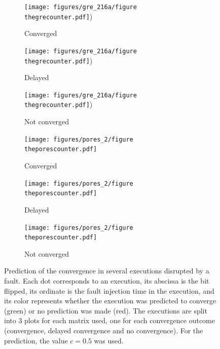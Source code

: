 \documentclass[twoside]{article}
\newcounter{fig}\setcounter{fig}{0}
\begin{document}
\begin{figure}[H]
    \begin{minipage}[b]{0.48\linewidth}
      \begin{subfigure}[t]{\linewidth}
        \centering
        \texttt{[image: figures/gre\_216a/figure\\thegrecounter.pdf]})
        \caption{Converged}\label{fig:gre_216a_conv_hist_location_0}		
      \end{subfigure}
      \quad
      \begin{subfigure}[t]{\linewidth}
        \centering
        \texttt{[image: figures/gre\_216a/figure\\thegrecounter.pdf]})
        \caption{Delayed}\label{fig:gre_216a_conv_hist_location_1}
      \end{subfigure}
      \quad
      \begin{subfigure}[t]{\linewidth}
        \centering
        \texttt{[image: figures/gre\_216a/figure\\thegrecounter.pdf]})
        \caption{Not converged}\label{fig:gre_216a_conv_hist_location_2}
      \end{subfigure}
    \end{minipage}
    \quad
    \begin{minipage}[b]{0.48\linewidth}
      \begin{subfigure}[t]{\linewidth}
        \centering
        \texttt{[image: figures/pores\_2/figure\\theporescounter.pdf]}
        \caption{Converged}\label{fig:pores_2_conv_hist_location_0}		
      \end{subfigure}
      \quad
      \begin{subfigure}[t]{\linewidth}
        \centering
        \texttt{[image: figures/pores\_2/figure\\theporescounter.pdf]}
        \caption{Delayed}\label{fig:pores_2_conv_hist_location_1}
      \end{subfigure}
      \quad
      \begin{subfigure}[t]{\linewidth}
        \centering
        \texttt{[image: figures/pores\_2/figure\\theporescounter.pdf]}
        \caption{Not converged}\label{fig:pores_2_conv_hist_location_2}
      \end{subfigure}
      

      
    \end{minipage}
    \caption{Prediction of the convergence in several executions disrupted by a fault. Each dot corresponds to an execution, its abscissa is the bit flipped, its ordinate is the fault injection time in the execution, and its color represents whether the execution was predicted to converge (green) or no prediction was made (red). The executions are split into 3 plots for each matrix used, one for each convergence outcome (convergence, delayed convergence and no convergence). For the prediction, the value $c=0.5$ was used.}\label{fig:prediction}
  \end{figure}
\end{document}
